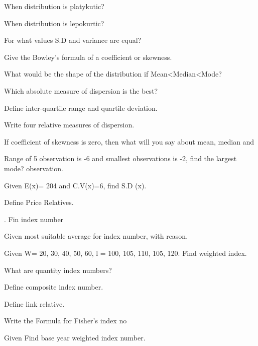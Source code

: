 \documentclass[11pt,a4paper]{article}
\begin{document}
\begin{shortlist}
\item When distribution is platykutic?

\item When distribution is lepokurtic?

\item For what values S.D and variance are equal?

\item Give the Bowley's formula of a coefficient or skewness.

\item What would be the shape of the distribution if Mean<Median<Mode?

\item Which absolute measure of dispersion is the best?

\item Define inter-quartile range and quartile deviation.

\item Write four relative measures of dispersion.

\item If coefficient of skewness is zero, then what will you say about mean, median and

\item Range of 5 observation is -6 and smallest observations is -2, find the largest mode? observation.

\item Given E(x)= 204 and C.V(x)=6, find S.D (x).

\item Define Price Relatives.

\item . Fin index number

\item Given most suitable average for index number, with reason.

\item Given W= 20, 30, 40, 50, 60, l = 100, 105, 110, 105, 120. Find weighted index.

\item What are quantity index numbers?

\item Define composite index number.

\item Define link relative.

\item Write the Formula for Fisher's index no

\item Given Find base year weighted index number.


\end{shortlist}
\end{document}
